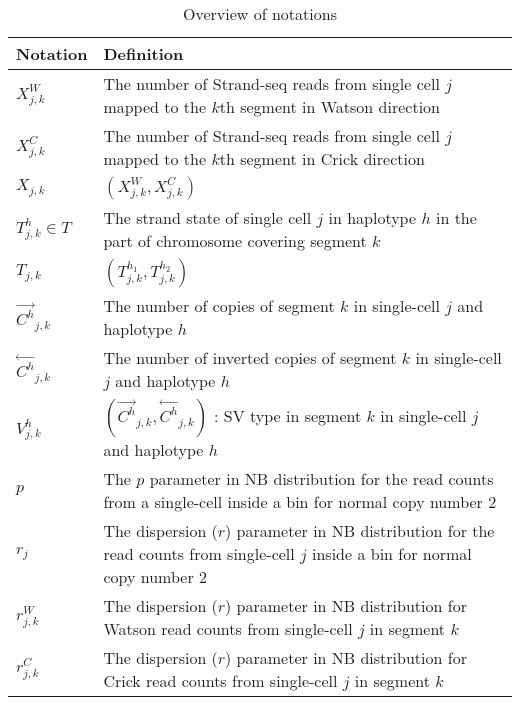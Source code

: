 \documentclass[12pt]{article}
\renewcommand{\j}{j} %
\newcommand{\CN}{C} %
\newcommand{\X}{X} %
\renewcommand{\k}{k} %
\newcommand{\h}{h} %
\newcommand{\T}{T} %
\newcommand{\V}{V} %
\begin{document}
\begin{table*}[tb]
	\caption{Overview of notations}
	\centering
	\begin{tabular}{  p{4cm} p{12.5cm} }
		\hline
		Notation & Definition\\
		\hline
		$\X_{\j,\k}^W$ & The number of Strand-seq reads from single cell $\j$ mapped to the $\k$th segment in Watson direction\\

		$\X_{\j,\k}^C$ & The number of Strand-seq reads from single cell $\j$ mapped to the $\k$th segment in Crick direction\\
		
		$\X_{\j,\k}$ & $(\X_{\j,\k}^W, \X_{\j,\k}^C)$\\
		
		$\T_{\j, \k}^{\h} \in \T$ & The strand state of single cell $\j$ in haplotype $\h$ in the part of chromosome covering segment $\k$\\
		
		$\T_{\j,\k}$ & $(\T_{\j, \k}^{\h_1}, \T_{\j, \k}^{\h_2})$\\
		
		$\stackrel{\rightarrow}{\CN^{\h}}_{\j,\k}$ & The number of copies of segment $\k$ in single-cell $\j$ and haplotype $\h$ \\
		
		$\stackrel{\leftarrow}{\CN^{\h}}_{\j,\k}$ & The number of inverted copies of segment $\k$ in single-cell $\j$ and haplotype $\h$ \\
		
		$\V_{\j, \k}^{\h}$ &$(\stackrel{\rightarrow}{\CN^{\h}}_{\j,\k}, \stackrel{\leftarrow}{\CN^{\h}}_{\j,\k})$ : SV type in segment $\k$ in single-cell $\j$ and haplotype $\h$\\
		
		$p$ & The $p$ parameter in NB distribution for the read counts from a single-cell inside a bin for normal copy number 2\\
		
		$r_\j$ & The dispersion ($r$) parameter in NB distribution for the read counts from single-cell $\j$ inside a bin for normal copy number 2\\
		
		$r_{\j,\k}^W$ & The dispersion ($r$) parameter in NB distribution for Watson read counts from single-cell $\j$ in segment $\k$\\
		
		$r_{\j,\k}^C$ & The dispersion ($r$) parameter in NB distribution for Crick read counts from single-cell $\j$ in segment $\k$\\
		

\end{tabular}
\end{table*}
\end{document}
